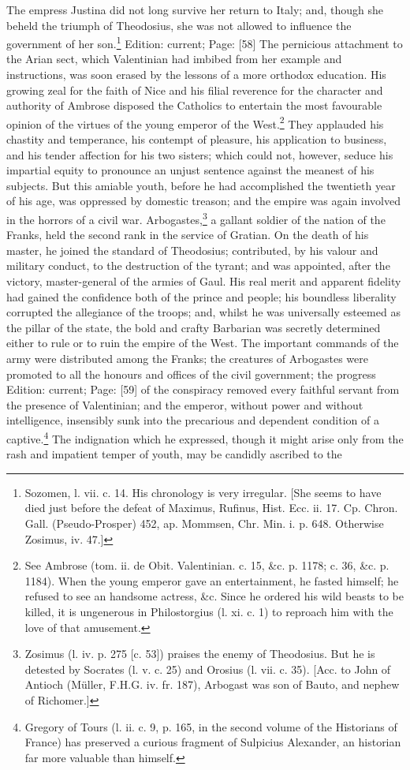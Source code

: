 The empress Justina did not long survive her return to Italy; and, though she beheld the triumph of Theodosius, she was not allowed to influence the government of her son.\footnote{Sozomen, l. vii. c. 14. His chronology is very irregular. [She seems to have died just before the defeat of Maximus, Rufinus, Hist. Ecc. ii. 17. Cp. Chron. Gall. (Pseudo-Prosper) 452, ap. Mommsen, Chr. Min. i. p. 648. Otherwise Zosimus, iv. 47.]} Edition: current; Page: [58] The pernicious attachment to the Arian sect, which Valentinian had imbibed from her example and instructions, was soon erased by the lessons of a more orthodox education. His growing zeal for the faith of Nice and his filial reverence for the character and authority of Ambrose disposed the Catholics to entertain the most favourable opinion of the virtues of the young emperor of the West.\footnote{See Ambrose (tom. ii. de Obit. Valentinian. c. 15, \&c. p. 1178; c. 36, \&c. p. 1184). When the young emperor gave an entertainment, he fasted himself; he refused to see an handsome actress, \&c. Since he ordered his wild beasts to be killed, it is ungenerous in Philostorgius (l. xi. c. 1) to reproach him with the love of that amusement.} They applauded his chastity and temperance, his contempt of pleasure, his application to business, and his tender affection for his two sisters; which could not, however, seduce his impartial equity to pronounce an unjust sentence against the meanest of his subjects. But this amiable youth, before he had accomplished the twentieth year of his age, was oppressed by domestic treason; and the empire was again involved in the horrors of a civil war. Arbogastes,\footnote{Zosimus (l. iv. p. 275 [c. 53]) praises the enemy of Theodosius. But he is detested by Socrates (l. v. c. 25) and Orosius (l. vii. c. 35). [Acc. to John of Antioch (Müller, F.H.G. iv. fr. 187), Arbogast was son of Bauto, and nephew of Richomer.]} a gallant soldier of the nation of the Franks, held the second rank in the service of Gratian. On the death of his master, he joined the standard of Theodosius; contributed, by his valour and military conduct, to the destruction of the tyrant; and was appointed, after the victory, master-general of the armies of Gaul. His real merit and apparent fidelity had gained the confidence both of the prince and people; his boundless liberality corrupted the allegiance of the troops; and, whilst he was universally esteemed as the pillar of the state, the bold and crafty Barbarian was secretly determined either to rule or to ruin the empire of the West. The important commands of the army were distributed among the Franks; the creatures of Arbogastes were promoted to all the honours and offices of the civil government; the progress Edition: current; Page: [59] of the conspiracy removed every faithful servant from the presence of Valentinian; and the emperor, without power and without intelligence, insensibly sunk into the precarious and dependent condition of a captive.\footnote{Gregory of Tours (l. ii. c. 9, p. 165, in the second volume of the Historians of France) has preserved a curious fragment of Sulpicius Alexander, an historian far more valuable than himself.} The indignation which he expressed, though it might arise only from the rash and impatient temper of youth, may be candidly ascribed to the 